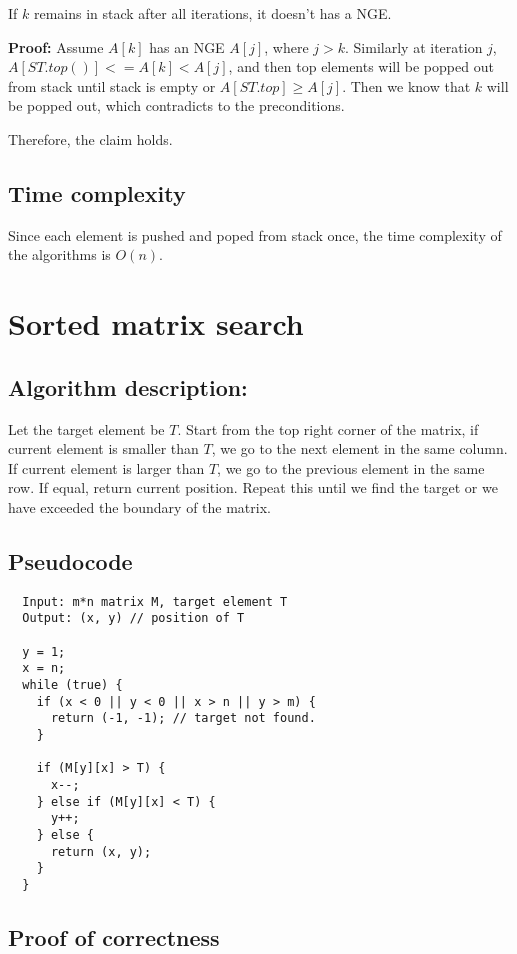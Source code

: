 \documentclass[paper=a4, fontsize=11pt]{scrartcl} %
\numberwithin{equation}{section} %
\numberwithin{figure}{section} %
\numberwithin{table}{section} %
\newcounter{claimcounter}
\numberwithin{claimcounter}{section}
\newenvironment{claim}{\stepcounter{claimcounter}{\textbf{Claim \theclaimcounter:}}}{}
\begin{document}
\begin{claim}
  If $k$ remains in stack after all iterations, it doesn't has a NGE. 
\end{claim}

\textbf{Proof:}
Assume $A[k]$ has an NGE $A[j]$, where $j > k$. Similarly at iteration $j$,
$A[ST.top()] <= A[k] < A[j]$, and then top elements will be popped 
out from stack until stack is empty or $A[ST.top] \geq A[j]$. Then we know that
$k$ will be popped out, which contradicts to the preconditions.

Therefore, the claim holds.

\subsection*{Time complexity}
Since each element is pushed and poped from stack once, the time complexity of
the algorithms is $O(n)$.


\section{Sorted matrix search}
\subsection*{Algorithm description:}
Let the target element be $T$.
Start from the top right corner of the matrix, if current element is smaller
than $T$, we go to the next element in the same column. If current element is 
larger than $T$, we go to the previous element in the same row. If equal, return
current position. Repeat this until we find the target or we have exceeded the
boundary of the matrix.

\subsection*{Pseudocode}
\begin{verbatim}
  Input: m*n matrix M, target element T
  Output: (x, y) // position of T

  y = 1;
  x = n;
  while (true) {
    if (x < 0 || y < 0 || x > n || y > m) {
      return (-1, -1); // target not found.
    }

    if (M[y][x] > T) {
      x--;
    } else if (M[y][x] < T) {
      y++;
    } else {
      return (x, y);
    }
  }
\end{verbatim}

\subsection*{Proof of correctness}
\end{document}
